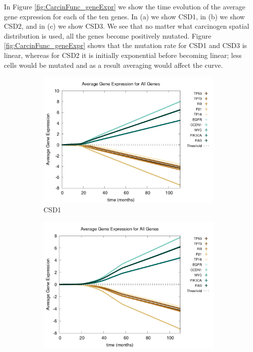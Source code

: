\documentclass[\main/thesis.tex]{subfiles}
\begin{document}
In Figure \ref{fig:CarcinFunc_geneExpr} we show the time evolution of the average gene expression for each of the ten genes. In (a) we show CSD1, in (b) we show CSD2, and in (c) we show CSD3. We see that no matter what carcinogen spatial distribution is used, all the genes become positively mutated. Figure \ref{fig:CarcinFunc_geneExpr} shows that the mutation rate for CSD1 and CSD3 is linear, whereas for CSD2 it is initially exponential before becoming linear; less cells would be mutated and as a result averaging would affect the curve. 
\begin{figure}[H]
    \centering
    \begin{subfigure}[t]{.6\textwidth}
      \centering
      \includegraphics[width=\textwidth]{images/4_CarcinFunc/Fig3/geneExprAll_all_Func1.png}
      \caption{CSD1}
      \label{fig:CarcinFunc_geneExpr_Func1}
    \end{subfigure}
    \begin{subfigure}[t]{.6\textwidth}
      \centering
      \includegraphics[width=\textwidth]{images/4_CarcinFunc/Fig3/geneExprAll_all_Func2.png}

\end{subfigure}
\end{figure}
\end{document}
